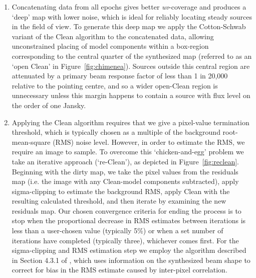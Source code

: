 \documentclass[5p,authoryear]{elsarticle}
\begin{document}
\begin{enumerate}[I]
 \item Concatenating data from all epochs gives better \textit{uv}-coverage and produces a `deep' map with lower noise, which is ideal for reliably locating steady sources in the field of view. To generate this deep map we apply the Cotton-Schwab variant of the Clean algorithm \citep{Schwab1984} to the concatenated data, allowing unconstrained placing of model components within a box-region corresponding to the central quarter of the synthesized map (referred to as an `open Clean' in Figure~\ref{fig:chimenea}). 
Sources outside this central region are attenuated by a primary beam response factor of less than 1 in 20,000 relative to the pointing centre, and so a wider open-Clean region is unnecessary unless this margin happens to contain a source with flux level on the order of one Jansky. 

 \item Applying the Clean algorithm requires that we give a pixel-value termination threshold, which is typically chosen as a multiple of the background root-mean-square (RMS) noise level. 
 However, in order to estimate the RMS, we require an image to sample. 
 To overcome this `chicken-and-egg' problem we take an iterative approach (`re-Clean'), as depicted in Figure~\ref{fig:reclean}. 
 Beginning with the dirty map, we take the pixel values from the residuals map (i.e. the image with any Clean-model components subtracted), apply sigma-clipping to estimate the background RMS,  apply Clean with the resulting calculated threshold, and then iterate by examining the new residuals map.
 Our chosen convergence criteria for ending the process is to stop when the proportional decrease in RMS estimates between iterations is less than a user-chosen value (typically 5\%) or when a set number of iterations have completed (typically three), whichever comes first. 
 For the sigma-clipping and RMS estimation step we employ the algorithm described in Section 4.3.1 of \cite{Swinbank2015}, which uses information on the synthesized beam shape to correct for bias in the RMS estimate caused by inter-pixel correlation.
 

\end{enumerate}
\end{document}
